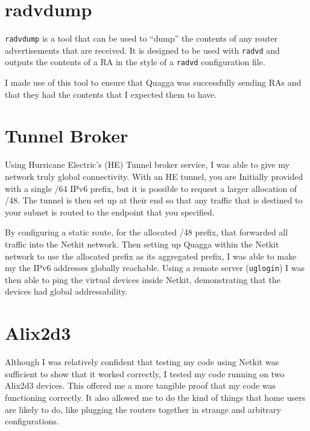 \documentclass[12pt]{report}
\begin{document}

\section{radvdump}
\texttt{radvdump} is a tool that can be used to ``dump'' the contents of any
router advertisements that are received. It is designed to be used with
\texttt{radvd} and outputs the contents of a RA in the style of a
\texttt{radvd} configuration file. 

I made use of this tool to ensure that Quagga was successfully sending RAs and
that they had the contents that I expected them to have. 


\section{Tunnel Broker}
Using Hurricane Electric's (HE) Tunnel broker service, I was able to give my
network truly global connectivity. With an HE tunnel, you are Initially
provided with a single /64 IPv6 prefix, but it is possible to request a larger
allocation of /48. The tunnel is then set up at their end so that any traffic
that is destined to your subnet is routed to the endpoint that you specified.  

By configuring a static route, for the allocated /48 prefix, that forwarded all
traffic into the Netkit network. Then setting up Quagga within the Netkit
network to use the allocated prefix as its aggregated prefix, I was able to
make my the IPv6 addresses globally reachable. Using a remote server
(\texttt{uglogin}) I was then able to ping the virtual devices inside Netkit,
demonstrating that the devices had global addressability.

\section{Alix2d3}
Although I was relatively confident that testing my code using Netkit was
sufficient to show that it worked correctly, I tested my code running on two
Alix2d3 devices. This offered me a more tangible proof that my code was
functioning correctly. It also allowed me to do the kind of things that home users
are likely to do, like plugging the routers together in strange and arbitrary
configurations.
\end{document}
